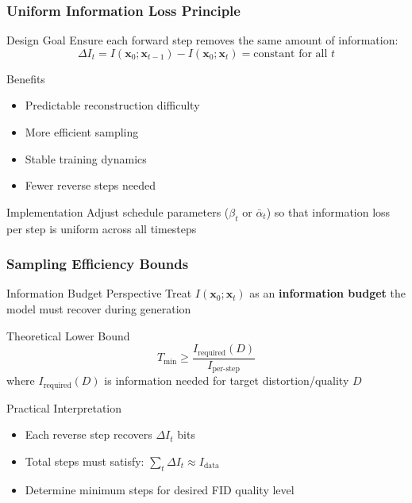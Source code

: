 \documentclass[aspectratio=169]{beamer}
\begin{document}
\begin{frame}
\frametitle{Uniform Information Loss Principle}
\begin{block}{Design Goal}
Ensure each forward step removes the same amount of information:
\begin{equation}
\Delta I_t = I(\mathbf{x}_0;\mathbf{x}_{t-1}) - I(\mathbf{x}_0;\mathbf{x}_t) = \text{constant for all } t
\end{equation}
\end{block}

\begin{block}{Benefits}
\begin{itemize}
\item \textcolor{mygreen}{Predictable reconstruction difficulty}
\item \textcolor{mygreen}{More efficient sampling}
\item \textcolor{mygreen}{Stable training dynamics}
\item \textcolor{mygreen}{Fewer reverse steps needed}
\end{itemize}
\end{block}

\begin{block}{Implementation}
Adjust schedule parameters ($\beta_t$ or $\bar{\alpha}_t$) so that information loss per step is uniform across all timesteps
\end{block}
\end{frame}

\begin{frame}
\frametitle{Sampling Efficiency Bounds}
\begin{block}{Information Budget Perspective}
Treat $I(\mathbf{x}_0;\mathbf{x}_t)$ as an \textbf{information budget} the model must recover during generation
\end{block}

\begin{block}{Theoretical Lower Bound}
\begin{equation}
T_{\min} \geq \frac{I_{\text{required}}(D)}{I_{\text{per-step}}}
\end{equation}
where $I_{\text{required}}(D)$ is information needed for target distortion/quality $D$
\end{block}

\begin{block}{Practical Interpretation}
\begin{itemize}
\item Each reverse step recovers $\Delta I_t$ bits
\item Total steps must satisfy: $\sum_t \Delta I_t \approx I_{\text{data}}$
\item Determine minimum steps for desired FID quality level
\end{itemize}
\end{block}

\end{frame}
\end{document}
